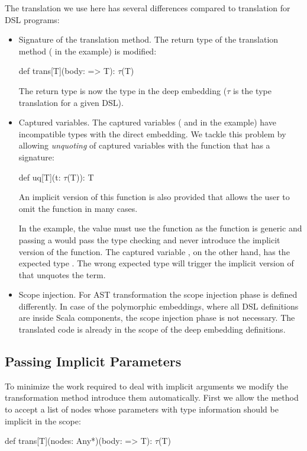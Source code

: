 The translation we use here has several differences compared to translation for DSL programs:\begin{itemize}
\item {Signature of the translation method.} The return type of the translation method ( in the
example) is modified:\begin{lstparagraph}
def trans[T](body: => T): $\tau$(T)
\end{lstparagraph} The return type is now the type in the deep embedding ($\tau$ is the type translation for a given DSL).

\item {Captured variables.} The captured variables ( and  in the example)
 have incompatible types with the direct embedding. We tackle this problem by allowing
 \emph{unquoting} of captured variables with the function  that has a signature:\begin{itemize}
  def uq[T](t: $\tau$(T)): T
\end{itemize}
An implicit version of this function is also provided that allows the user to omit the function in many cases.

In the example, the value  must use the  function as
the function  is generic and passing a  would pass the type checking and never
introduce the implicit version of the function. The captured variable , on the other hand,
has the expected type . The wrong expected type will trigger the implicit version of 
that unquotes the term.

\item {Scope injection.} For AST transformation the scope injection phase is defined differently. In case of the
 polymorphic embeddings, where all DSL definitions are inside Scala components, the scope injection phase is not necessary. The
 translated code is already in the scope of the deep embedding definitions.

\end{itemize}

\subsection{Passing Implicit Parameters}
\label{sec:dealing-with-implict-parameters}

To minimize the work required to deal with implicit arguments we modify the transformation
method introduce them automatically. First we allow the method to accept a list of
 nodes whose parameters with type information should be implicit in the scope:\begin{lstparagraph}
def trans[T](nodes: Any*)(body: => T): $\tau$(T)
\end{lstparagraph}

